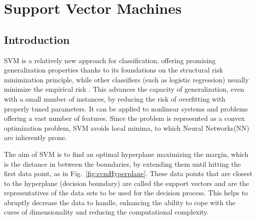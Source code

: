 \section{Support Vector Machines}

\subsection{Introduction}

SVM is a relatively new approach for classification, offering promising generalization properties thanks to its foundations on the structural risk minimization principle, while other classifiers (such as logistic regression) usually minimize the empirical risk \cite{gunn1998support,yin2014study}. 
This advances the capacity of generalization, even with a small number of instances, by reducing the risk of overfitting with properly tuned parameters. 
It can be applied to nonlinear systems and problems offering a vast number of features. 
Since the problem is represented as a convex optimization problem, SVM avoids local minima, to which Neural Networks(NN) are inherently prone.

The aim of SVM is to find an optimal hyperplane maximizing the margin, which is the distance in between the boundaries, by extending them until hitting the first data point, as in Fig.~\ref{fig:svmHyperplane}. These data points that are closest to the hyperplane (decision boundary) are called the support vectors and are the representatives of the data sets to be used for the decision process. This helps to abruptly decrease the data to handle, enhancing the ability to cope with the curse of dimensionality and reducing the computational complexity.

